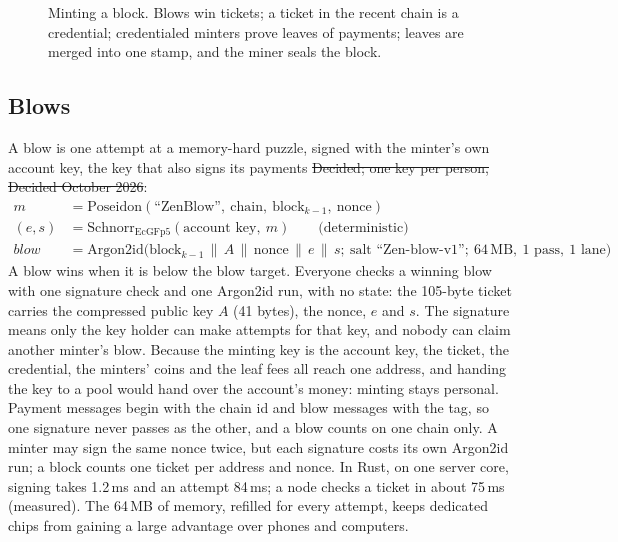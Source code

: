 \begin{figure}[tbp]
\caption{Minting a block. Blows win tickets; a ticket in the recent chain is a credential; credentialed minters prove leaves of payments; leaves are merged into one stamp, and the miner seals the block.}
\label{fig:pipeline}
\end{figure}

\subsection{Blows}
A blow is one attempt at a memory-hard puzzle, signed with the minter's own account key, the key that also signs its payments \st{Decided; one key per person, Decided October 2026}:
\begin{align*}
m &= \mathrm{Poseidon}(\text{``ZenBlow''},\ \text{chain},\ \text{block}_{k-1},\ \text{nonce})\\
(e, s) &= \mathrm{Schnorr}_{\text{EcGFp5}}(\text{account key},\ m) \qquad \text{(deterministic)}\\
\mathit{blow} &= \mathrm{Argon2id}\big(\text{block}_{k-1}\,\|\,A\,\|\,\text{nonce}\,\|\,e\,\|\,s;\ \text{salt ``Zen-blow-v1''};\ 64\,\text{MB},\ 1\text{ pass},\ 1\text{ lane}\big)
\end{align*}
A blow wins when it is below the blow target. Everyone checks a winning blow with one signature check and one Argon2id run, with no state: the 105-byte ticket carries the compressed public key $A$ (41 bytes), the nonce, $e$ and $s$. The signature means only the key holder can make attempts for that key, and nobody can claim another minter's blow. Because the minting key is the account key, the ticket, the credential, the minters' coins and the leaf fees all reach one address, and handing the key to a pool would hand over the account's money: minting stays personal. Payment messages begin with the chain id and blow messages with the tag, so one signature never passes as the other, and a blow counts on one chain only. A minter may sign the same nonce twice, but each signature costs its own Argon2id run; a block counts one ticket per address and nonce. In Rust, on one server core, signing takes 1.2\,ms and an attempt 84\,ms; a node checks a ticket in about 75\,ms (measured). The 64\,MB of memory, refilled for every attempt, keeps dedicated chips from gaining a large advantage over phones and computers.

